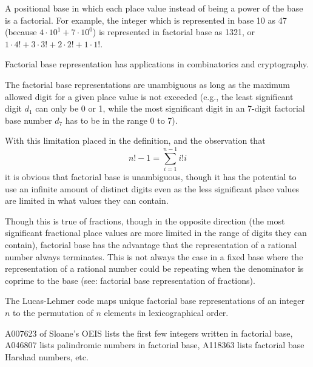 \documentclass[12pt]{article}
\begin{document}
A positional base in which each place value instead of being a power of the base is a factorial. For example, the integer which is represented in base 10 as 47 (because $4 \cdot 10^1 + 7 \cdot 10^0$) is represented in factorial base as 1321, or $1 \cdot 4! + 3 \cdot 3! + 2 \cdot 2! + 1 \cdot 1!$.

Factorial base representation has applications in combinatorics and cryptography.

The factorial base representations are unambiguous as long as the maximum allowed digit for a given place value is not exceeded (e.g., the least significant digit $d_1$ can only be 0 or 1, while the most significant digit in an 7-digit factorial base number $d_7$ has to be in the range 0 to 7).

With this limitation placed in the definition, and the observation that $$n! - 1 = \sum_{i = 1}^{n - 1} i!i$$ it is obvious that factorial base is unambiguous, though it has the potential to use an infinite amount of distinct digits even as the less significant place values are limited in what values they can contain.

Though this is true of fractions, though in the opposite direction (the most significant fractional place values are more limited in the range of digits they can contain), factorial base has the advantage that the representation of a rational number always terminates. This is not always the case in a fixed base where the representation of a rational number could be repeating when the denominator is coprime to the base (see: factorial base representation of fractions).

The Lucas-Lehmer code maps unique factorial base representations of an integer $n$ to the permutation of $n$ elements in lexicographical order.

A007623 of Sloane's OEIS lists the first few integers written in factorial base, A046807 lists palindromic numbers in factorial base, A118363 lists factorial base Harshad numbers, etc.
\end{document}

